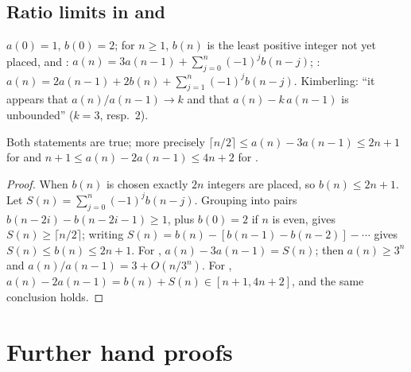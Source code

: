 \subsection{Ratio limits in  and }\label{s:A298173}
$a(0)=1$, $b(0)=2$; for $n\ge1$, $b(n)$ is the least positive integer not yet placed, and
: $a(n)=3a(n-1)+\sum_{j=0}^n(-1)^jb(n-j)$; : $a(n)=2a(n-1)+2b(n)+\sum_{j=1}^n(-1)^jb(n-j)$.
Kimberling: ``it appears that $a(n)/a(n-1)\to k$ and that $a(n)-k\,a(n-1)$ is unbounded'' ($k=3$, resp.\ $2$).
\begin{theorem} Both statements are true; more precisely $\lceil n/2\rceil\le a(n)-3a(n-1)\le2n+1$ for
 and $n+1\le a(n)-2a(n-1)\le4n+2$ for .\end{theorem}
\begin{proof} When $b(n)$ is chosen exactly $2n$ integers are placed, so $b(n)\le2n+1$. Let
$S(n)=\sum_{j=0}^n(-1)^jb(n-j)$. Grouping into pairs $b(n-2i)-b(n-2i-1)\ge1$, plus $b(0)=2$ if $n$ is even, gives
$S(n)\ge\lceil n/2\rceil$; writing $S(n)=b(n)-[b(n-1)-b(n-2)]-\cdots$ gives $S(n)\le b(n)\le2n+1$. For
, $a(n)-3a(n-1)=S(n)$; then $a(n)\ge3^n$ and $a(n)/a(n-1)=3+O(n/3^n)$. For ,
$a(n)-2a(n-1)=b(n)+S(n)\in[n+1,4n+2]$, and the same conclusion holds. \end{proof}

\section{Further hand proofs}\label{s:hand}
